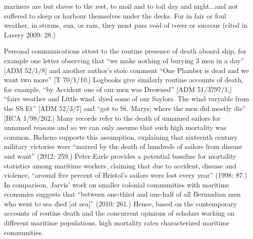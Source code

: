 \begin{styleStandard}
mariners are but slaves to the rest, to moil and to toil day and night...and not suffered to sleep or harbour themselves under the decks. For in fair or foul weather, in storms, sun, or rain, they must pass void of cover or succour (cited in Lavery 2009: 28.) 
\end{styleStandard}

\begin{styleStandard}
Personal communications attest to the routine presence of death aboard ship, for example one letter observing that “we make nothing of burying 3 men in a day” [ADM 52/1/8] and another author’s stoic comment “One Plamber is dead and we want two more” [T 70/1/10.] Logbooks give similarly routine accounts of death, for example, “by Accident one of our men was Drowned” [ADM 51/3797/1,] “faire weather and Little wind. dyed some of our Saylors. The wind varyable from the SS Et” [ADM 52/3/7] and “got to St. Marys; where the men did mostly die” [HCA 1/98/262.] Many records refer to the death of unnamed sailors for unnamed reasons and so we can only assume that such high mortality was common. Bicheno supports this assumption, explaining that sixteenth century military victories were “marred by the death of hundreds of sailors from disease and want” (2012: 259.) Peter Earle provides a potential baseline for mortality statistics among maritime workers, claiming that due to accident, disease and violence, “around five percent of Bristol’s sailors were lost every year” (1998: 87.) In comparison, Jarvis’ work on smaller colonial communities with maritime economies suggests that “between one-third and one-half of all Bermudian men who went to sea died [at sea]” (2010: 261.) Hence, based on the contemporary accounts of routine death and the concurrent opinions of scholars working on different maritime populations, high mortality rates characterized maritime communities. 
\end{styleStandard}


